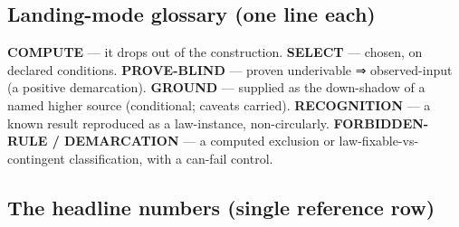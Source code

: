 \hypertarget{landing-mode-glossary-one-line-each}{%
\subsection{Landing-mode glossary (one line each)}\label{landing-mode-glossary-one-line-each}}

\textbf{COMPUTE} --- it drops out of the construction. \textbf{SELECT} --- chosen, on declared conditions. \textbf{PROVE-BLIND} --- proven
underivable ⇒ observed-input (a positive demarcation). \textbf{GROUND} --- supplied as the down-shadow of a named higher
source (conditional; caveats carried). \textbf{RECOGNITION} --- a known result reproduced as a law-instance, non-circularly.
\textbf{FORBIDDEN-RULE / DEMARCATION} --- a computed exclusion or law-fixable-vs-contingent classification, with a can-fail
control.

\hypertarget{the-headline-numbers-single-reference-row}{%
\subsection{The headline numbers (single reference row)}\label{the-headline-numbers-single-reference-row}}


